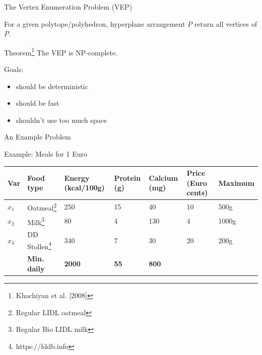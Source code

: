 \documentclass[10pt]{beamer}
\begin{document}
\begin{frame}{The Vertex Enumeration Problem (VEP)}
	\begin{definition}
		For a given polytope/polyhedron, hyperplane arrangement $P$ return all vertices of $P$.
		
	\end{definition}
	\pause 
	\begin{alertblock}{Theorem\footnote{Khachiyan et al. [2008]}}
		The VEP is NP-complete.
	\end{alertblock}
	\pause
	Goals:
	\begin{itemize}
		\item should be deterministic
		\item should be fast
		\item shouldn't use too much space
	\end{itemize}
\end{frame}

\begin{frame}{An Example Problem}
	\begin{exampleblock}{Example: Meals for 1 Euro}
	\vspace{0.4cm}
	\begin{tabular}{|p{0.35cm}|l|p{1.5cm}|p{0.9cm}|p{}|p{0.75cm}|p{1.5cm}|}
		\hline
		Var&Food type&Energy (kcal/100g)&Protein (g)&Calcium (mg)&Price (Euro cents)&Maximum\\
		\hline
		$x_1$&Oatmeal\footnote{Regular LIDL oatmeal}&250&15&40&10&500g\\
		$x_2$&Milk\footnote{Regular Bio LIDL milk}&80&4&130&4&1000g\\
		$x_3$&DD Stollen\footnote{https://fddb.info}&340&7&30&20&200g\\
		\hline
		&\textbf{Min. daily}&\textbf{2000}&\textbf{55}&\textbf{800}&&\\
		\hline
	\end{tabular}
	\vspace{0.4cm}
	\end{exampleblock}	
\end{frame}
\end{document}
